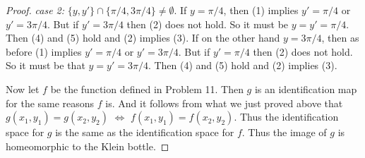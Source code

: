\documentclass{book}
\begin{document}
\begin{enumerate}[(1)]
\begin{proof}
            \par {\it case 2:} $\{y,y'\}\cap\{\pi/4,3\pi/4\}\not=\emptyset$.  If $y=\pi/4$, then (1) implies $y'=\pi/4$ or $y'=3\pi/4$.  But if $y'=3\pi/4$ then (2) does not hold.  So it must be $y=y'=\pi/4$.  Then (4) and (5) hold and (2) implies (3).  If on the other hand $y=3\pi/4$, then as before (1) implies $y'=\pi/4$ or $y'=3\pi/4$.  But if $y'=\pi/4$ then (2) does not hold.  So it must be that $y=y'=3\pi/4$.  Then (4) and (5) hold and (2) implies (3).

            \par  Now let $f$ be the function defined in Problem 11.  Then $g$ is an identification map for the same reasons $f$ is.  And it follows from what we just proved above that $g(x_1,y_1)=g(x_2,y_2)$ $\Leftrightarrow$ $f(x_1,y_1)=f(x_2,y_2)$.  Thus the identification space for $g$ is the same as the identification space for $f$.  Thus the image of $g$ is homeomorphic to the Klein bottle.
        \end{proof}
\end{enumerate}
\end{document}
